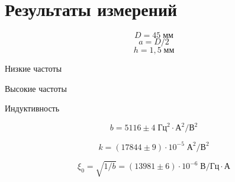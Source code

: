 \section{Результаты измерений}

\[
    D = 45\;\text{мм}
\]
\[
    a = D/2
\]
\[
    h = 1{,}5\;\text{мм}
\]


\begin{table}[!ht]
    \centering
    \caption{Низкие частоты}
    
\end{table}

\begin{table}[!ht]
    \centering
    \caption{Высокие частоты}
    \resizebox{\columnwidth}{!}{}
\end{table}

\begin{table}[!ht]
    \centering
    \caption{Индуктивность}
    
\end{table}

\begin{figure}[ht!]
\end{figure}

\[
    b = 5116 \pm 4\;\text{Гц}^{2}\cdot\text{А}^{2} / \text{В}^{2}
\]

\[
    k = \left(17844 \pm 9\right)\cdot 10^{-5}\;\text{А}^{2} / \text{В}^{2}
\]

\[
    \xi_0 = \sqrt{1/b} =  \left(13981 \pm 6\right)\cdot 10^{-6}\;\text{В} / \text{Гц}\cdot\text{А}
\]

